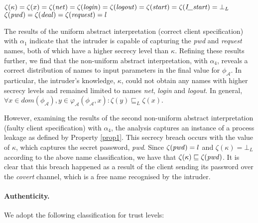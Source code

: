 \documentclass[10pt,a4paper,final,oneside,fleqn]{book}
\begin{document}
\noindent
$\zeta(\kappa)=\zeta(x)=\zeta(\mbox{{\itshape net\/}})=\zeta(\mbox{{\itshape login\/}})=\zeta(\mbox{{\itshape logout\/}})=\zeta(\mbox{{\itshape start\/}})=\zeta(\mbox{{\itshape I\_start\/}})=\bot_L$\\
$\zeta(\mbox{{\itshape pwd\/}})=\zeta(\mbox{{\itshape deal\/}})=\zeta(\mbox{{\itshape request\/}})=l$\vspace{6mm}

\noindent
The results of the uniform abstract interpretation (correct client specification) with $\alpha_1$ indicate that the intruder is capable of capturing the {\itshape pwd\/} and {\itshape request\/} names, both of which have a higher secrecy level than $\kappa$.  Refining these results further, we find that the non-uniform abstract interpretation, with $\alpha_4$, reveals a correct distribution of names to input parameters in the final value for $\phi_\mathcal{A}$.  In particular, the intruder's knowledge, $\kappa$, could not obtain any names with higher secrecy levels and remained limited to names {\itshape net\/}, {\itshape login\/} and {\itshape logout\/}.  In general, $\forall x\in dom(\phi_\mathcal{A}),y\in\varphi_\mathcal{A}(\phi_\mathcal{A},x):\zeta(y)\sqsubseteq_L\zeta(x)$.

However, examining the results of the second non-uniform abstract interpretation (faulty client specification) with $\alpha_4$, the analysis captures an instance of a process leakage as defined by Property \ref{prop1}. This secrecy breach occurs with the value of $\kappa$, which captures the secret password, {\itshape pwd\/}.  Since $\zeta(\mbox{{\itshape pwd\/}})=l$ and $\zeta(\kappa)=\bot_L$ according to the above name classification, we have that $\zeta(\kappa)\sqsubseteq\zeta(\mbox{{\itshape pwd\/}})$. It is clear that this breach happened as a result of the client sending its password over the {\itshape covert\/} channel, which is a free name recognised by the intruder.

\paragraph{Authenticity.} We adopt the following classification for trust levels:\vspace{6mm}
\end{document}
